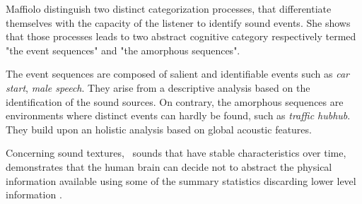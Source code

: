 \documentclass[twoside,twocolumn]{article}
\begin{document}
Maffiolo \cite{maffiolo_caracterisation_1999} distinguish two distinct categorization processes, that differentiate themselves with the capacity of the listener to identify sound events. She shows that those processes leads to two abstract cognitive category respectively termed "the event sequences" and "the amorphous sequences".


The event sequences are composed of salient and identifiable events such as \emph{car start}, \emph{male speech}. They arise from a descriptive analysis based on the identification of the sound sources. On contrary, the amorphous sequences are environments where distinct events can hardly be found, such as \emph{traffic hubhub}. They build upon an holistic analysis based on global acoustic features.


Concerning sound textures, \ie~sounds that have stable characteristics over time, \cite{mcdermott2011sound,mcdermott2013summary} demonstrates that the human brain can decide not to abstract the physical information available using some of the summary statistics discarding lower level information \cite{nelken2013ear}.

\end{document}
